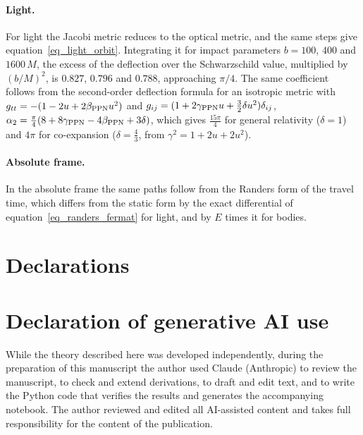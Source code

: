 \documentclass{iopjournal}
\begin{document}
\begin{appendices}
\paragraph{Light.} For light the Jacobi metric reduces to the optical metric, and the same steps give equation~\eqref{eq_light_orbit}. Integrating it for impact parameters $b=100$, $400$ and $1600\,M$, the excess of the deflection over the Schwarzschild value, multiplied by $(b/M)^2$, is $0.827$, $0.796$ and $0.788$, approaching $\pi/4$. The same coefficient follows from the second-order deflection formula for an isotropic metric with $g_{tt}=-(1-2u+2\beta_{\rm PPN}u^2)$ and $g_{ij}=(1+2\gamma_{\rm PPN}u+\tfrac32\delta u^2)\delta_{ij}$, $\alpha_2=\tfrac{\pi}{4}(8+8\gamma_{\rm PPN}-4\beta_{\rm PPN}+3\delta)$, which gives $\tfrac{15\pi}{4}$ for general relativity ($\delta=1$) and $4\pi$ for co-expansion ($\delta=\tfrac43$, from $\gamma^2=1+2u+2u^2$).

\paragraph{Absolute frame.} In the absolute frame the same paths follow from the Randers form of the travel time, which differs from the static form by the exact differential of equation~\eqref{eq_randers_fermat} for light, and by $E$ times it for bodies.

\end{appendices}

\section*{Declarations}




\section*{Declaration of generative AI use}
While the theory described here was developed independently, during the preparation of this manuscript the author used Claude (Anthropic) to review the manuscript, to check and extend derivations, to draft and edit text, and to write the Python code that verifies the results and generates the accompanying notebook. The author reviewed and edited all AI-assisted content and takes full responsibility for the content of the publication.

\printbibliography
\end{document}
